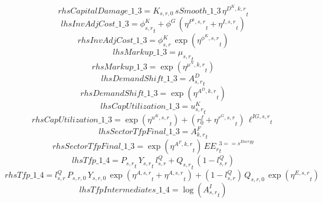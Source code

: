 \begin{dmath*}
rhsCapitalDamage\_1\_3 = {{K_{s,r,0}}}\, {sSmooth\_1\_3}\, {{\eta^{D^{K},k,r}}}_{t}
\end{dmath*}
\begin{dmath*}
lhsInvAdjCost\_1\_3 = {{\phi^K_{s,r}}}_{t}+{{\phi^{G}}}\, \left({{\eta^{P^k,s,r}}}_{t}+{{\eta^{I,s,r}}}_{t}\right)
\end{dmath*}
\begin{dmath*}
rhsInvAdjCost\_1\_3 = {{\phi^{K}_{s,r}}}\, \exp\left({{\eta^{\phi^{K},{s,r}}}}_{t}\right)
\end{dmath*}
\begin{dmath*}
lhsMarkup\_1\_3 = {{\mu_{s,r}}}_{t}
\end{dmath*}
\begin{dmath*}
rhsMarkup\_1\_3 = \exp\left({{\eta^{\mu^{N},k,r}}}_{t}\right)
\end{dmath*}
\begin{dmath*}
lhsDemandShift\_1\_3 = {{A^{D}_{s,r}}}_{t}
\end{dmath*}
\begin{dmath*}
rhsDemandShift\_1\_3 = \exp\left({{\eta^{A^{D},k,r}}}_{t}\right)
\end{dmath*}
\begin{dmath*}
lhsCapUtilization\_1\_3 = {{u^K_{s,r}}}_{t}
\end{dmath*}
\begin{dmath*}
rhsCapUtilization\_1\_3 = \exp\left({{\eta^{u^K,s,r}}}_{t}\right)+\left({{r^f_0}}+{{\eta^{r^G,s,r}}}_{t}\right)\, {{\ell^{IG,s,r}}}_{t}
\end{dmath*}
\begin{dmath*}
lhsSectorTfpFinal\_1\_3 = {{A^{F}_{k,r}}}_{t}
\end{dmath*}
\begin{dmath*}
rhsSectorTfpFinal\_1\_3 = \exp\left({{\eta^{A^F,k,r}}}_{t}\right)\, {{EE_r}}_{t}^{3=={{s^{Energy}}}}
\end{dmath*}
\begin{dmath*}
lhsTfp\_1\_4 = {{P_{s,r}}}_{t}\, {{Y_{s,r}}}_{t}\, {{l^{Q}_{s,r}}}+{{Q_{s,r}}}_{t}\, \left(1-{{l^{Q}_{s,r}}}\right)
\end{dmath*}
\begin{dmath*}
rhsTfp\_1\_4 = {{l^{Q}_{s,r}}}\, {{P_{s,r,0}}}\, {{Y_{s,r,0}}}\, \exp\left({{\eta^{A,s,r}}}_{t}+{{\eta^{A,s,r}}}_{t}\right)+\left(1-{{l^{Q}_{s,r}}}\right)\, {{Q_{s,r,0}}}\, \exp\left({{\eta^{E,s,r}}}_{t}\right)
\end{dmath*}
\begin{dmath*}
lhsTfpIntermediates\_1\_4 = \log\left({{A^{I}_{s,r}}}_{t}\right)
\end{dmath*}
